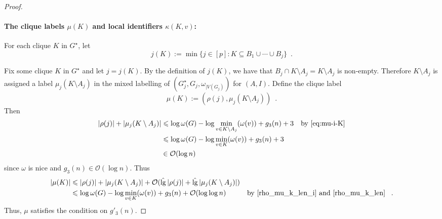 \documentclass{patmorin}
\let\eqref\cref
\renewcommand{\le}{\leqslant}
\newcommand{\pat}[1]{\noindent\textcolor{Magenta}{PaMo: #1}}
\newcommand{\piotr}[1]{\noindent\textcolor{red}{PiMi: #1}}
\DeclareMathOperator{\lgg}{\hat{lg}}
\newcommand{\Oh}{\mathcal{O}}
\begin{document}
\begin{proof}
    \paragraph{\boldmath The clique labels $\mu(K)$ and local identifiers $\kappa(K,v)$:}
    For each clique $K$ in $G^\star$,
    let
    \[
      j(K):=\min\{j\in[p]:K\subseteq B_1\cup\cdots\cup B_j\}\enspace.
    \]

    Fix some clique $K$ in $G^\star$  and let $j=j(K)$.  By the definition of $j(K)$, we have that $B_j\cap K\setminus A_j=K\setminus A_j$ is non-empty.
    Therefore $K\setminus A_j$ is assigned a label $\mu_j(K\setminus A_j)$ in the mixed labelling of $(G^\star_j,G_j,\omega_{|V(G_j)})$ for $(A,I)$.
    Define the clique label
    \[
        \mu(K):=(\rho(j),\mu_j(K\setminus A_j)) \enspace .
    \]
    Then
    \begin{align}
       |\rho(j)|+|\mu_j(K\setminus A_j)|
       & \le \log\omega(G)-\log\min_{v\in K\setminus A_j}(\omega(v))+g_3(n)+3 &\textrm{by~\eqref{eq:mu-i-K}} \\
       & \le \log\omega(G)-\log\min_{v\in K}(\omega(v))+g_3(n)+3   \label{rho_mu_k_len_i} \\
       & \in \Oh(\log n)
       \label{rho_mu_k_len}
    \end{align}
    since $\omega$ is nice and $g_3(n)\in\Oh(\log n)$.  Thus
    \begin{align*}
        |\mu(K)|
        & \le |\rho(j)|+|\mu_j(K\setminus A_j)| + \Oh(\lgg|\rho(j)|+\lgg|\mu_j(K\setminus A_j)|) \\
        & \le \log\omega(G)-\log\min_{v\in K}(\omega(v)) + g_3(n)+\Oh(\log\log n) & \text{by \eqref{rho_mu_k_len_i} and \eqref{rho_mu_k_len} } \enspace .
    \end{align*}
    Thus, $\mu$ satisfies the condition on $g'_3(n)$.


\end{proof}
\end{document}
